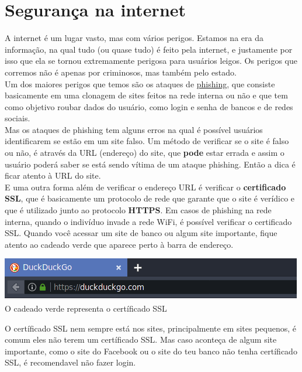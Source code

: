 \documentclass[12pt, letterpaper]{report}
\begin{document}
\section*{Segurança na internet}
	A internet é um lugar vasto, mas com vários perigos. Estamos na era da informação, na qual tudo (ou quase tudo) é feito pela internet, e justamente por isso que ela se tornou extremamente perigosa para usuários leigos. Os perigos que corremos não é apenas por criminosos, mas também pelo estado.\\

	Um dos maiores perigos que temos são os ataques de \href{https://criptowiki.miraheze.org/wiki/Phishing}{phishing}, que consiste basicamente em uma clonagem de sites feitos na rede interna ou não e que tem como objetivo roubar dados do usuário, como login e senha de bancos e de redes sociais.\\

	Mas os ataques de phishing tem alguns erros na qual é possível usuários identificarem se estão em um site falso. Um método de verificar se o site é falso ou não, é através da URL (endereço) do site, que \textbf{pode} estar errada e assim o usuário poderá saber se está sendo vítima de um ataque phishing. Então a dica é ficar atento à URL do site.\\

	E uma outra forma além de verificar o endereço URL é verificar o \textbf{certificado SSL}, que é basicamente um protocolo de rede que garante que o site é verídico e que é utilizado junto ao protocolo \textbf{HTTPS}. Em casos de phishing na rede interna, quando o indivíduo invade a rede WiFi, é possível verificar o certificado SSL. Quando você acessar um site de banco ou algum site importante, fique atento ao cadeado verde que aparece perto à barra de endereço.

	\begin{center}
		\includegraphics[scale=1]{Duck.png}\\
		\footnotesize O cadeado verde representa o certíficado SSL
	\end{center}

	O certíficado SSL nem sempre está nos sites, principalmente em sites pequenos, é comum eles não terem um certíficado SSL. Mas caso aconteça de algum site importante, como o site do Facebook ou o site do teu banco não tenha certíficado SSL, é recomendavel não fazer login.\\
\end{document}
